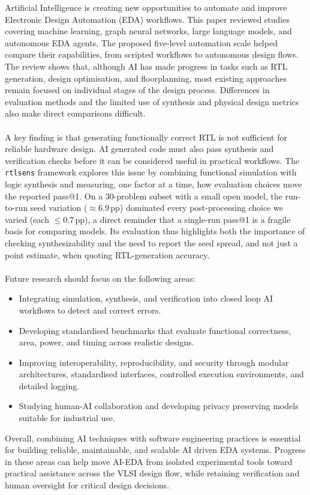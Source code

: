 \documentclass[conference]{IEEEtran}
\begin{document}
Artificial Intelligence is creating new opportunities to automate and improve Electronic Design Automation (EDA) workflows. This paper reviewed studies covering machine learning, graph neural networks, large language models, and autonomous EDA agents. The proposed five-level automation scale helped compare their capabilities, from scripted workflows to autonomous design flows. The review shows that, although AI has made progress in tasks such as RTL generation, design optimisation, and floorplanning, most existing approaches remain focused on individual stages of the design process. Differences in evaluation methods and the limited use of synthesis and physical design metrics also make direct comparisons difficult.
\\\\
\noindent A key finding is that generating functionally correct RTL is not sufficient for reliable hardware design. AI generated code must also pass synthesis and verification checks before it can be considered useful in practical workflows. The \texttt{rtlsens} framework explores this issue by combining functional simulation with logic synthesis and measuring, one factor at a time, how evaluation choices move the reported pass@1. On a 30-problem subset with a small open model, the run-to-run seed variation ($\approx 6.9$\,pp) dominated every post-processing choice we varied (each $\leq 0.7$\,pp), a direct reminder that a single-run pass@1 is a fragile basis for comparing models. Its evaluation thus highlights both the importance of checking synthesizability and the need to report the seed spread, and not just a point estimate, when quoting RTL-generation accuracy.
\\\\
\noindent Future research should focus on the following areas:
\begin{itemize}
    \item Integrating simulation, synthesis, and verification into closed loop AI workflows to detect and correct errors.
    \item Developing standardised benchmarks that evaluate functional correctness, area, power, and timing across realistic designs.
    \item Improving interoperability, reproducibility, and security through modular architectures, standardised interfaces, controlled execution environments, and detailed logging.
    \item Studying human-AI collaboration and developing privacy preserving models suitable for industrial use.\\
\end{itemize}

\noindent Overall, combining AI techniques with software engineering practices is essential for building reliable, maintainable, and scalable AI driven EDA systems. Progress in these areas can help move AI-EDA from isolated experimental tools toward practical assistance across the VLSI design flow, while retaining verification and human oversight for critical design decisions.



\end{document}
